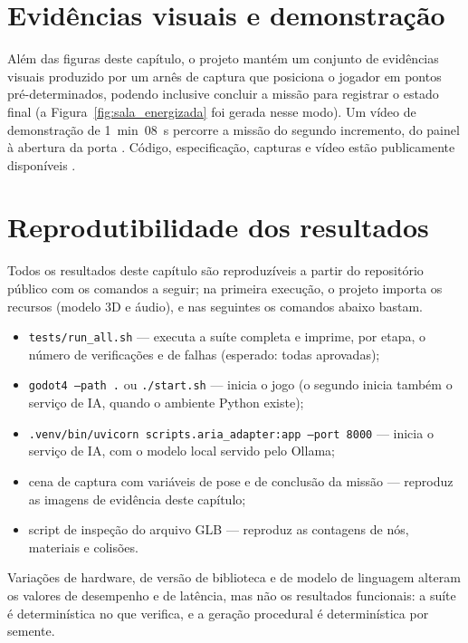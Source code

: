 \section{Evidências visuais e demonstração}
\label{sec:res_evidencias}

Além das figuras deste capítulo, o projeto mantém um conjunto de evidências
visuais produzido por um arnês de captura que posiciona o jogador em pontos
pré-determinados, podendo inclusive concluir a missão para registrar o estado
final (a Figura~\ref{fig:sala_energizada} foi gerada nesse modo). Um vídeo de
demonstração de 1~min~08~s percorre a missão do segundo incremento, do painel
à abertura da porta \cite{lab404video}. Código, especificação, capturas e
vídeo estão publicamente disponíveis \cite{lab404repo}.

\section{Reprodutibilidade dos resultados}
\label{sec:reprodutibilidade}

Todos os resultados deste capítulo são reproduzíveis a partir do repositório
público \cite{lab404repo} com os comandos a seguir; na primeira execução, o
projeto importa os recursos (modelo 3D e áudio), e nas seguintes os comandos
abaixo bastam.

\begin{itemize}
  \item \texttt{tests/run\_all.sh} --- executa a suíte completa e imprime, por
  etapa, o número de verificações e de falhas (esperado: todas aprovadas);
  \item \texttt{godot4 --path .} ou \texttt{./start.sh} --- inicia o jogo (o
  segundo inicia também o serviço de IA, quando o ambiente Python existe);
  \item \texttt{.venv/bin/uvicorn scripts.aria\_adapter:app --port 8000} ---
  inicia o serviço de IA, com o modelo local servido pelo Ollama;
  \item cena de captura com variáveis de pose e de conclusão da missão ---
  reproduz as imagens de evidência deste capítulo;
  \item script de inspeção do arquivo GLB --- reproduz as contagens de nós,
  materiais e colisões.
\end{itemize}

Variações de hardware, de versão de biblioteca e de modelo de linguagem
alteram os valores de desempenho e de latência, mas não os resultados
funcionais: a suíte é determinística no que verifica, e a geração procedural
é determinística por semente.

